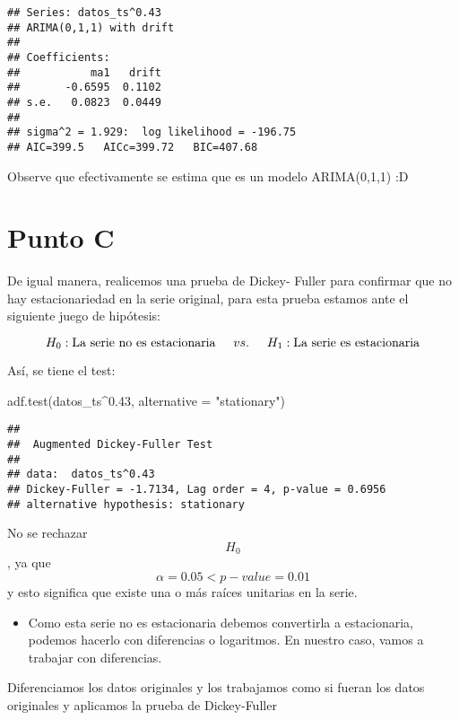 \documentclass[
]{article}
\newenvironment{Shaded}{\begin{snugshade}}{\end{snugshade}}
\newcommand{\AttributeTok}[1]{\textcolor[rgb]{0.77,0.63,0.00}{#1}}
\newcommand{\FloatTok}[1]{\textcolor[rgb]{0.00,0.00,0.81}{#1}}
\newcommand{\FunctionTok}[1]{\textcolor[rgb]{0.00,0.00,0.00}{#1}}
\newcommand{\NormalTok}[1]{#1}
\newcommand{\SpecialCharTok}[1]{\textcolor[rgb]{0.00,0.00,0.00}{#1}}
\newcommand{\StringTok}[1]{\textcolor[rgb]{0.31,0.60,0.02}{#1}}
\providecommand{\tightlist}{%
  \setlength{\itemsep}{0pt}\setlength{\parskip}{0pt}}
\begin{document}
\begin{verbatim}
## Series: datos_ts^0.43 
## ARIMA(0,1,1) with drift 
## 
## Coefficients:
##           ma1   drift
##       -0.6595  0.1102
## s.e.   0.0823  0.0449
## 
## sigma^2 = 1.929:  log likelihood = -196.75
## AIC=399.5   AICc=399.72   BIC=407.68
\end{verbatim}

Observe que efectivamente se estima que es un modelo ARIMA(0,1,1) :D

\hypertarget{punto-c}{%
\section{Punto C}\label{punto-c}}

De igual manera, realicemos una prueba de Dickey- Fuller para confirmar
que no hay estacionariedad en la serie original, para esta prueba
estamos ante el siguiente juego de hipótesis:

\[H_0:\text{La serie no es estacionaria}\hspace{0.5cm}vs.\hspace{0.5cm}H_1:\text{La serie es estacionaria}\]

Así, se tiene el test:

\begin{Shaded}
\begin{Highlighting}[]
\FunctionTok{adf.test}\NormalTok{(datos\_ts}\SpecialCharTok{\^{}}\FloatTok{0.43}\NormalTok{, }\AttributeTok{alternative =} \StringTok{"stationary"}\NormalTok{)}
\end{Highlighting}
\end{Shaded}

\begin{verbatim}
## 
##  Augmented Dickey-Fuller Test
## 
## data:  datos_ts^0.43
## Dickey-Fuller = -1.7134, Lag order = 4, p-value = 0.6956
## alternative hypothesis: stationary
\end{verbatim}

No se rechazar \[H_0\], ya que \[\alpha=0.05<p-value=0.01\] y esto
significa que existe una o más raíces unitarias en la serie.

\begin{itemize}
\tightlist
\item
  Como esta serie no es estacionaria debemos convertirla a estacionaria,
  podemos hacerlo con diferencias o logaritmos. En nuestro caso, vamos a
  trabajar con diferencias.
\end{itemize}

Diferenciamos los datos originales y los trabajamos como si fueran los
datos originales y aplicamos la prueba de Dickey-Fuller
\end{document}
